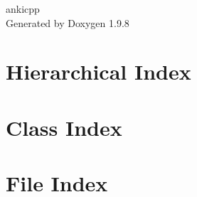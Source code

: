 \documentclass[twoside]{book}
\newcommand{\+}{\discretionary{\mbox{\scriptsize$\hookleftarrow$}}{}{}}
\newcommand{\clearemptydoublepage}{%
    \newpage{\pagestyle{empty}\cleardoublepage}%
  }
\begin{document}
  \raggedbottom
    \hypersetup{pageanchor=false,
                bookmarksnumbered=true,
                pdfencoding=unicode
               }
  \begin{titlepage}
  \vspace*{7cm}
  \begin{center}%
  {\Large ankicpp}\\
  \vspace*{1cm}
  {\large Generated by Doxygen 1.9.8}\\
  \end{center}
  \end{titlepage}
  \clearemptydoublepage
  \tableofcontents
  \clearemptydoublepage
  \hypersetup{pageanchor=true}
\chapter{Hierarchical Index}

\chapter{Class Index}

\chapter{File Index}

\end{document}
